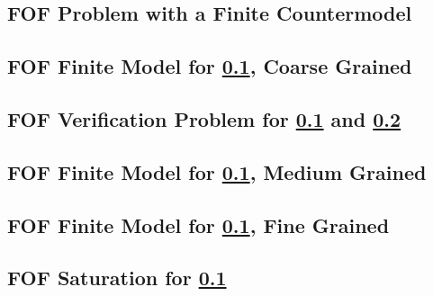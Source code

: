 \documentclass{easychair}
\begin{document}
\subsection{FOF Problem with a Finite Countermodel}
\label{FOF_Finite.p}
\begin{small}

\end{small}

\newpage
\subsection{FOF Finite Model for \ref{FOF_Finite.p}, Coarse Grained}
\label{FOF_Finite.s}
\begin{small}

\end{small}

\newpage
\subsection{FOF Verification Problem for \ref{FOF_Finite.p} and \ref{FOF_Finite.s}}
\label{FOF_Finite.s.p}
\begin{small}

\end{small}

\newpage
\subsection{FOF Finite Model for \ref{FOF_Finite.p}, Medium Grained}
\label{FOF_Finite_Medium.s}
\begin{small}

\end{small}

\newpage
\subsection{FOF Finite Model for \ref{FOF_Finite.p}, Fine Grained}
\label{FOF_Finite_Fine.s}
\begin{small}

\end{small}

\newpage
\subsection{FOF Saturation for \ref{FOF_Finite.p}}
\label{FOF_Saturation.s}
\begin{small}

\end{small}
\end{document}
